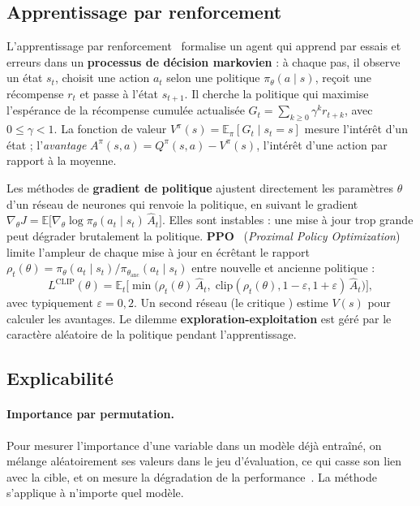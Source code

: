 \subsection{Apprentissage par renforcement}

L'apprentissage par renforcement~\cite{sutton2018} formalise un agent qui apprend par essais et erreurs dans un \textbf{processus de décision markovien} : à chaque pas, il observe un état $s_t$, choisit une action $a_t$ selon une politique $\pi_\theta(a\mid s)$, reçoit une récompense $r_t$ et passe à l'état $s_{t+1}$. Il cherche la politique qui maximise l'espérance de la récompense cumulée actualisée $G_t = \sum_{k\geq0}\gamma^k r_{t+k}$, avec $0 \leq \gamma < 1$. La fonction de valeur $V^\pi(s) = \mathbb{E}_\pi[G_t \mid s_t = s]$ mesure l'intérêt d'un état ; l'\emph{avantage} $A^\pi(s,a) = Q^\pi(s,a) - V^\pi(s)$, l'intérêt d'une action par rapport à la moyenne.

Les méthodes de \textbf{gradient de politique} ajustent directement les paramètres $\theta$ d'un réseau de neurones qui renvoie la politique, en suivant le gradient $\nabla_\theta J = \mathbb{E}\big[\nabla_\theta \log\pi_\theta(a_t\mid s_t)\,\hat A_t\big]$. Elles sont instables : une mise à jour trop grande peut dégrader brutalement la politique. \textbf{PPO}~\cite{schulman2017} (\emph{Proximal Policy Optimization}) limite l'ampleur de chaque mise à jour en \og écrêtant \fg{} le rapport $\rho_t(\theta) = \pi_\theta(a_t\mid s_t)/\pi_{\theta_{\text{anc}}}(a_t\mid s_t)$ entre nouvelle et ancienne politique :
\begin{equation}
  L^{\text{CLIP}}(\theta) = \mathbb{E}_t\Big[\min\big(\rho_t(\theta)\,\hat A_t,\; \text{clip}(\rho_t(\theta), 1-\varepsilon, 1+\varepsilon)\,\hat A_t\big)\Big],
\end{equation}
avec typiquement $\varepsilon = 0{,}2$. Un second réseau (le \og critique \fg{}) estime $V(s)$ pour calculer les avantages. Le dilemme \textbf{exploration-exploitation} est géré par le caractère aléatoire de la politique pendant l'apprentissage.

\subsection{Explicabilité}

\paragraph{Importance par permutation.} Pour mesurer l'importance d'une variable dans un modèle déjà entraîné, on mélange aléatoirement ses valeurs dans le jeu d'évaluation, ce qui casse son lien avec la cible, et on mesure la dégradation de la performance~\cite{breiman2001}. La méthode s'applique à n'importe quel modèle.

